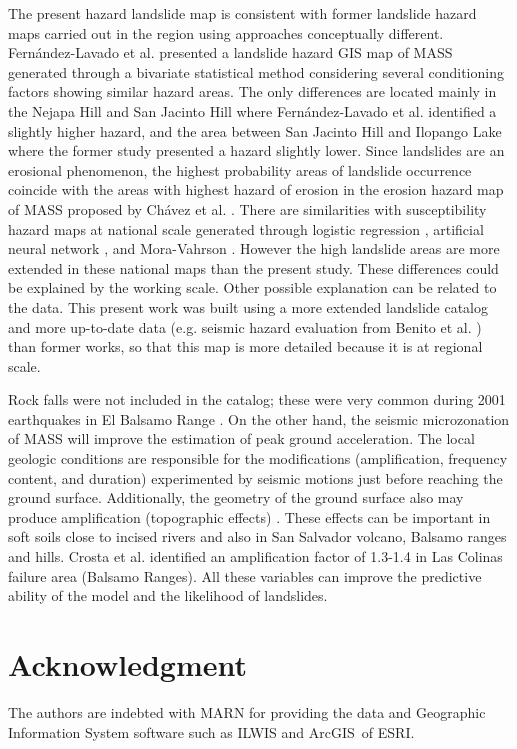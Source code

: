 \documentclass[11pt,twoside]{rmta2010eng}%
\begin{document}
The present hazard landslide map is consistent with former landslide hazard maps carried out in the region using approaches conceptually different. Fern\'{a}ndez-Lavado et al.\cite{fernan2008} presented a landslide hazard GIS map of MASS generated through a bivariate statistical method considering several conditioning factors showing similar hazard areas. The only differences are located mainly in the Nejapa Hill and San Jacinto Hill where Fern\'{a}ndez-Lavado et al. \cite{fernan2008} identified a slightly higher hazard, and the area between San Jacinto Hill and Ilopango Lake where the former study presented a hazard slightly lower. Since landslides are an erosional phenomenon, the highest probability areas of landslide occurrence coincide with the areas with highest hazard of erosion in the erosion hazard map of MASS proposed by Ch\'{a}vez et al. \cite{chavez2014a}. There are similarities with susceptibility hazard maps at national scale generated through logistic regression \cite{garcia2008}, artificial neural network \cite{garcia2010}, and Mora-Vahrson \cite{snet2004}. However the high landslide areas are more extended in these national maps than the present study. These differences could be explained by the working scale. Other possible explanation can be related to the data. This present work was built using a more extended landslide catalog and more up-to-date data (e.g. seismic hazard evaluation from Benito et al. \cite{beni2012}) than former works, so that this map is more detailed because it is at regional scale.

Rock falls were not included in the catalog; these were very common during 2001 earthquakes in El Balsamo Range \cite{jibson}. On the other hand, the seismic microzonation of MASS will improve the estimation of peak ground acceleration. The local geologic conditions are responsible for the modifications (amplification, frequency content, and duration) experimented by seismic motions just before reaching the ground surface. Additionally, the geometry of the ground surface also may produce amplification (topographic effects) \cite{aki1993}. These effects can be important in soft soils close to incised rivers and also in San Salvador volcano, Balsamo ranges and hills. Crosta et al. \cite{crosta2005} identified an amplification factor of 1.3-1.4 in Las Colinas failure area (Balsamo Ranges). All these variables can improve the predictive ability of the model and the likelihood of landslides.



\section{Acknowledgment}   
The authors are indebted with MARN for providing the data and Geographic Information System software such as ILWIS and ArcGIS\textregistered \  of ESRI.
\end{document}
